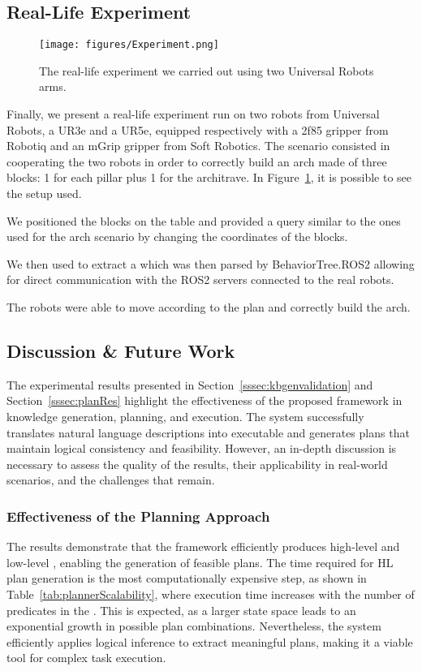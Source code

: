 \subsection{Real-Life Experiment}

\begin{figure}
    \centering
    \texttt{[image: figures/Experiment.png]}
    \caption{The real-life experiment we carried out using two Universal Robots arms.}
    \label{fig:rlexp}
\end{figure}

Finally, we present a real-life experiment run on two robots from Universal Robots, a UR3e and a UR5e, equipped respectively with a 2f85 gripper from Robotiq and an mGrip gripper from Soft Robotics. The scenario consisted in cooperating the two robots in order to correctly build an arch made of three blocks: 1 for each pillar plus 1 for the architrave. In Figure~\ref{fig:rlexp}, it is possible to see the setup used.

We positioned the blocks on the table and provided a query similar to the ones used for the arch scenario by changing the coordinates of the blocks. 

We then used \frameworkname to extract a \bt which was then parsed by BehaviorTree.ROS2 allowing for direct communication with the ROS2 servers connected to the real robots. 

The robots were able to move according to the plan and correctly build the arch.

\subsection{Discussion \& Future Work}
\label{ssec:discussion}

The experimental results presented in Section~\ref{sssec:kbgenvalidation} and Section~\ref{sssec:planRes} highlight the effectiveness of the proposed framework in knowledge generation, planning, and execution. The system successfully translates natural language descriptions into executable \kbases and generates plans that maintain logical consistency and feasibility. However, an in-depth discussion is necessary to assess the quality of the results, their applicability in real-world scenarios, and the challenges that remain.

\subsubsection{Effectiveness of the Planning Approach}
The results demonstrate that the framework efficiently produces high-level and low-level \kbases, enabling the generation of feasible plans. The time required for HL plan generation is the most computationally expensive step, as shown in Table~\ref{tab:plannerScalability}, where execution time increases with the number of predicates in the \kb. This is expected, as a larger state space leads to an exponential growth in possible plan combinations. Nevertheless, the system efficiently applies logical inference to extract meaningful plans, making it a viable tool for complex task execution.

